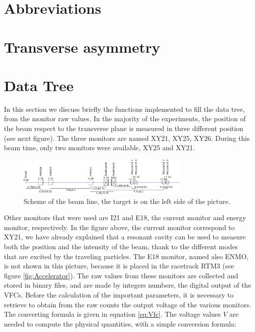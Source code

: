 \begin{appendices}

\section{Abbreviations}

\section{Transverse asymmetry}

\section{Data Tree}

In this section we discuss briefly the functions implemented to fill the data tree, from the monitor raw values. In the majority of the \transv experiments, the position of the beam respect to the transverse plane is measured in three different position (see next figure). The three monitors are named XY21, XY25, XY26. During this beam time, only two monitors were available, XY25 and XY21. 

\begin{figure}[hbtp]
\centering
\includegraphics[width = 0.75\textwidth]{figures/XYMOCalibBeamLine.pdf}
\caption{Scheme of the beam line, the target is on the left side of the picture.}
\end{figure}

Other monitors that were used are I21 and E18, the current monitor and energy monitor, respectively. In the figure above, the current monitor correspond to XY21, we have already explained that a resonant cavity can be used to measure both the position and the intensity of the beam, thank to the different modes that are excited by the traveling particles. The E18 monitor, named also ENMO, is not shown in this picture, because it is placed in the racetrack RTM3 (see figure \ref{fig:Accelerator}). 
The raw values from these monitors are collected and stored in binary files, and are made by integers numbers, the digital output of the VFCs. Before the calculation of the important parameters, it is necessary to retrieve to obtain from the raw counts the output voltage of the various monitors. The converting formula is given in equation \ref{eq:Vfc}. The voltage values $V$ are needed to compute the physical quantities, with a simple conversion formula:


\end{appendices}
